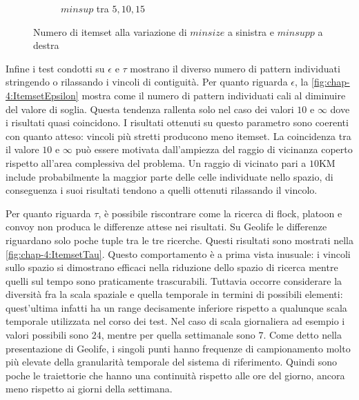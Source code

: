 \begin{figure}
\begin{subfigure}{.5\textwidth}
   \caption{\(minsup\)  tra \(5,10,15\)}%
  \label{fig:chap-4:ItemsetMinsupp}
  \end{subfigure}%
  \caption{Numero di itemset alla variazione di \(minsize\) a sinistra e \(minsupp\) a destra}%
  \label{fig:chap-4:ItemsetMinsizeandMinsupp}
\end{figure}

Infine i test condotti su \(\epsilon\) e \(\tau\) mostrano il diverso numero di pattern individuati stringendo o rilassando i vincoli di contiguità.
Per quanto riguarda \(\epsilon\), la \cref{fig:chap-4:ItemsetEpsilon} mostra come il numero di pattern individuati cali al diminuire del valore di soglia.
Questa tendenza rallenta solo nel caso dei valori \(10\) e \(\infty\) dove i risultati quasi coincidono.
I risultati ottenuti su questo parametro sono coerenti con quanto atteso: vincoli più stretti producono meno itemset.
La coincidenza tra il valore \(10\) e \(\infty\) può essere motivata dall'ampiezza del raggio di vicinanza coperto rispetto all'area complessiva del problema.
Un raggio di vicinato pari a \(10\)KM include probabilmente la maggior parte delle celle individuate nello spazio, di conseguenza i suoi risultati tendono a quelli ottenuti rilassando il vincolo.

Per quanto riguarda \(\tau\), è possibile riscontrare come la ricerca di flock, platoon e convoy non produca le differenze attese nei risultati.
Su Geolife le differenze riguardano solo poche tuple tra le tre ricerche.
Questi risultati sono mostrati nella \cref{fig:chap-4:ItemsetTau}.
Questo comportamento è a prima vista inusuale: i vincoli sullo spazio si dimostrano efficaci nella riduzione dello spazio di ricerca mentre quelli sul tempo sono praticamente trascurabili.
Tuttavia occorre considerare la diversità fra la scala spaziale e quella temporale in termini di possibili elementi: quest'ultima infatti ha un range decisamente inferiore rispetto a qualunque scala temporale utilizzata nel corso dei test.
Nel caso di scala giornaliera ad esempio i valori possibili sono \(24\), mentre per quella settimanale sono \(7\).
Come detto nella presentazione di Geolife, i singoli punti hanno frequenze di campionamento molto più elevate della granularità temporale del sistema di riferimento.
Quindi sono poche le traiettorie che hanno una continuità rispetto alle ore del giorno, ancora meno rispetto ai giorni della settimana.


